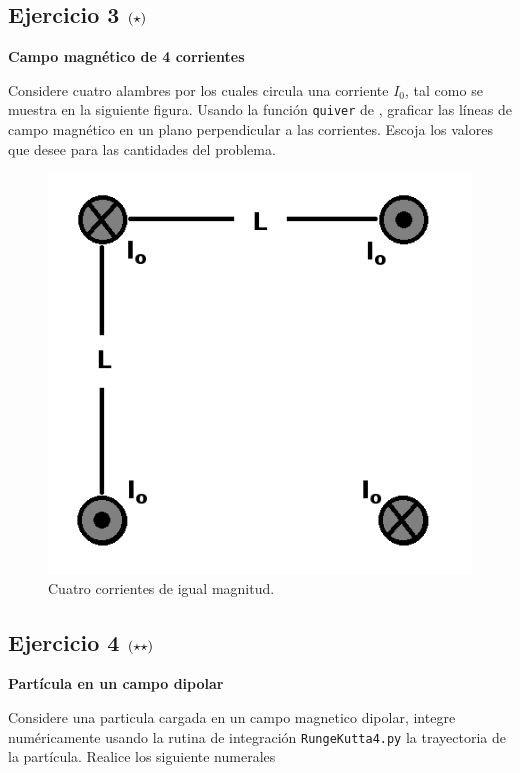\subsection*{Ejercicio 3 \large{$\left( \star \right)$}}

\textbf{Campo magnético de 4 corrientes}

Considere cuatro alambres por los cuales circula una corriente $I_0$, tal
como se muestra en la siguiente figura. Usando la función \texttt{quiver}
de \matplotlib, graficar las líneas de campo magnético en un plano 
perpendicular a las corrientes. Escoja los valores que desee para las 
cantidades del problema.

\begin{figure}[htbp]
	\centering
	\includegraphics[width=0.4
	\textwidth]
	{./pictures/fourcorrients.png}

	\caption{\small{Cuatro corrientes de igual magnitud.}}
	
	\label{fig:fourcorrients}
\end{figure}


\subsection*{Ejercicio 4 \large{$\left( \star \star \right)$}}

\textbf{Partícula en un campo dipolar}

Considere una particula cargada en un campo magnetico dipolar, integre 
numéricamente usando la rutina de integración \texttt{RungeKutta4.py} la 
trayectoria de la partícula. Realice los siguiente numerales

